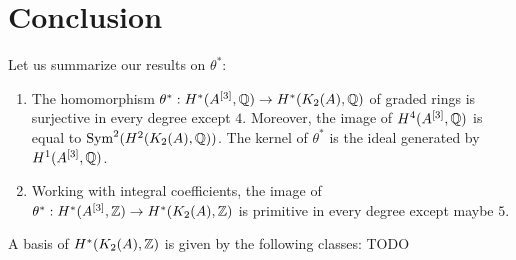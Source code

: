 \section{Conclusion}
Let us summarize our results on $\theta^*$:
\begin{theorem}\label{thetaTheorem}
\begin{enumerate}
\item The homomorphism $\theta^* : H^*(A\hilb{3},\Q)\rightarrow H^*(\kum{A}{2},\Q)$ of graded rings is surjective in every degree except $4$. Moreover, the image of $H^4(A\hilb{3},\Q)$ is equal to $\Sym^2(H^2(\kum{A}{2},\Q))$. 
The kernel of $\theta^*$ is the ideal generated by $H^1(A\hilb{3},\Q)$.
\item Working with integral coefficients, the image of $\theta^* : H^*(A\hilb{3},\Z)\rightarrow H^*(\kum{A}{2},\Z)$ is primitive in every degree except maybe $5$.
\end{enumerate}
\end{theorem}

\begin{theorem}\label{basismain}
A basis of $H^*(\kum{A}{2},\Z)$ is given by the following classes:
TODO
\end{theorem}
